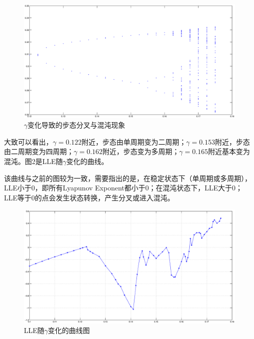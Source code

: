 \documentclass[UTF8]{ctexart}
\begin{document}
\begin{figure}[htbp]
\centerline{\includegraphics[width=\textwidth]{chaos.eps}}
\caption[]{$\gamma$变化导致的步态分叉与混沌现象}
\end{figure}
\par
大致可以看出，$\gamma=0.122$附近，步态由单周期变为二周期；$\gamma=0.153$附近，步态由二周期变为四周期；$\gamma=0.162$附近，步态变为多周期；$\gamma=0.165$附近基本变为混沌。图2是LLE随$\gamma$变化的曲线。\par
该曲线与之前的图较为一致，需要指出的是，在稳定状态下（单周期或多周期），LLE小于0，即所有Lyapunov Exponent都小于0；在混沌状态下，LLE大于0；LLE等于0的点会发生状态转换，产生分叉或进入混沌。\par
\begin{figure}[htbp]
\centerline{\includegraphics[width=\textwidth]{LyapunovExponent.eps}}
\caption[]{LLE随$\gamma$变化的曲线图}
\end{figure}
\par
\end{document}
